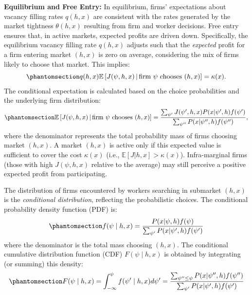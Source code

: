 \documentclass[
  11pt,
  letterpaper,
  DIV=11,
  numbers=noendperiod]{scrartcl}
\theoremstyle{plain}
\theoremstyle{remark}
\begin{document}
\textbf{Equilibrium and Free Entry:} In equilibrium, firms' expectations
about vacancy filling rates \(q(h,x)\) are consistent with the rates
generated by the market tightness \(\theta(h,x)\) resulting from firm
and worker decisions. Free entry ensures that, in active markets,
expected profits are driven down. Specifically, the equilibrium vacancy
filling rate \(q(h, x)\) adjusts such that the \emph{expected} profit
for a firm entering market \((h, x)\) is zero on average, considering
the mix of firms likely to choose that market. This implies:
\begin{equation}\phantomsection\label{eq-tightnessDeterminationSoftmax}{ q(h, x) \mathbb{E}\left[ J(\psi, h, x) \,|\, \text{firm } \psi \text{ chooses } (h,x) \right] = \kappa(x). }\end{equation}
The conditional expectation is calculated based on the choice
probabilities and the underlying firm distribution:
\begin{equation}\phantomsection\label{eq-conditionalJSoftmax}{ \mathbb{E}\left[ J(\psi, h, x) \,|\, \text{firm } \psi \text{ chooses } (h,x) \right] = \frac{\sum_{\psi'} J(\psi', h, x) P(x | \psi', h) f(\psi')}{\sum_{\psi''} P(x | \psi'', h) f(\psi'')}, }\end{equation}
where the denominator represents the total probability mass of firms
choosing market \((h,x)\). A market \((h,x)\) is active only if this
expected value is sufficient to cover the cost \(\kappa(x)\) (i.e.,
\(\mathbb{E}[J|h,x] > \kappa(x)\)). Infra-marginal firms (those with
high \(J(\psi, h, x)\) relative to the average) may still perceive a
positive expected profit from participating.

The distribution of firms encountered by workers searching in submarket
\((h, x)\) is the \emph{conditional distribution}, reflecting the
probabilistic choices. The conditional probability density function
(PDF) is:
\begin{equation}\phantomsection\label{eq-firmDensitySubmarketSoftmax}{ f(\psi \mid h, x) = \frac{P(x | \psi, h) f(\psi)}{\sum_{\psi'} P(x | \psi', h) f(\psi')} }\end{equation}
where the denominator is the total mass choosing \((h,x)\). The
conditional cumulative distribution function (CDF) \(F(\psi \mid h, x)\)
is obtained by integrating (or summing) this density:
\begin{equation}\phantomsection\label{eq-firmDistributionSubmarketSoftmax}{ F(\psi \mid h, x) = \int_{-\infty}^{\psi} f(\psi' \mid h, x) d\psi' = \frac{\sum_{\psi'' \le \psi} P(x | \psi'', h) f(\psi'')}{\sum_{\psi'} P(x | \psi', h) f(\psi')} }\end{equation}
\end{document}
